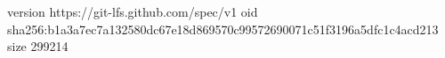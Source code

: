 version https://git-lfs.github.com/spec/v1
oid sha256:b1a3a7ec7a132580dc67e18d869570c99572690071c51f3196a5dfc1c4acd213
size 299214

